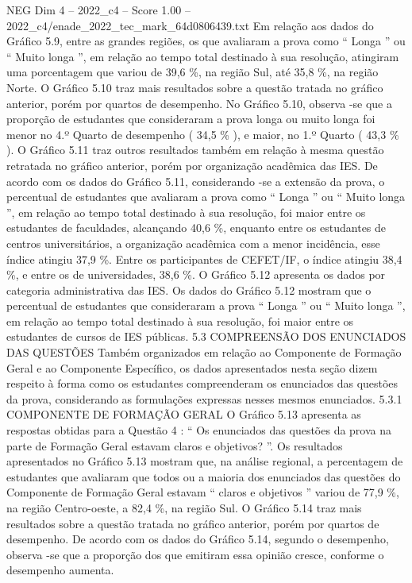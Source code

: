 \begin{textsample}{NEG Dim 4 – 2022\_c4 – Score 1.00 – 2022\_c4/enade\_2022\_tec\_mark\_64d0806439.txt}
Em relação aos dados do Gráfico 5.9, entre as grandes regiões, os que avaliaram a prova como “ Longa ” ou “ Muito longa ”, em relação ao tempo total destinado à sua resolução, atingiram uma porcentagem que variou de 39,6 \%, na região Sul, até 35,8 \%, na região Norte.
O Gráfico 5.10 traz mais resultados sobre a questão tratada no gráfico anterior, porém por quartos de desempenho.
No Gráfico 5.10, observa -se que a proporção de estudantes que consideraram a prova longa ou muito longa foi menor no 4.º Quarto de desempenho ( 34,5 \% ), e maior, no 1.º Quarto ( 43,3 \% ).
O Gráfico 5.11 traz outros resultados também em relação à mesma questão retratada no gráfico anterior, porém por organização acadêmica das IES.
De acordo com os dados do Gráfico 5.11, considerando -se a extensão da prova, o percentual de estudantes que avaliaram a prova como “ Longa ” ou “ Muito longa ”, em relação ao tempo total destinado à sua resolução, foi maior entre os estudantes de faculdades, alcançando 40,6 \%, enquanto entre os estudantes de centros universitários, a organização acadêmica com a menor incidência, esse índice atingiu 37,9 \%.
Entre os participantes de CEFET/IF, o índice atingiu 38,4 \%, e entre os de universidades, 38,6 \%.
O Gráfico 5.12 apresenta os dados por categoria administrativa das IES.
Os dados do Gráfico 5.12 mostram que o percentual de estudantes que consideraram a prova “ Longa ” ou “ Muito longa ”, em relação ao tempo total destinado à sua resolução, foi maior entre os estudantes de cursos de IES públicas. 5.3 COMPREENSÃO DOS ENUNCIADOS DAS QUESTÕES Também organizados em relação ao Componente de Formação Geral e ao Componente Específico, os dados apresentados nesta seção dizem respeito à forma como os estudantes compreenderam os enunciados das questões da prova, considerando as formulações expressas nesses mesmos enunciados. 5.3.1 COMPONENTE DE FORMAÇÃO GERAL O Gráfico 5.13 apresenta as respostas obtidas para a Questão 4 : “ Os enunciados das questões da prova na parte de Formação Geral estavam claros e objetivos? ”.
Os resultados apresentados no Gráfico 5.13 mostram que, na análise regional, a percentagem de estudantes que avaliaram que todos ou a maioria dos enunciados das questões do Componente de Formação Geral estavam “ claros e objetivos ” variou de 77,9 \%, na região Centro-oeste, a 82,4 \%, na região Sul.
O Gráfico 5.14 traz mais resultados sobre a questão tratada no gráfico anterior, porém por quartos de desempenho.
De acordo com os dados do Gráfico 5.14, segundo o desempenho, observa -se que a proporção dos que emitiram essa opinião cresce, conforme o desempenho aumenta.

\end{textsample}
